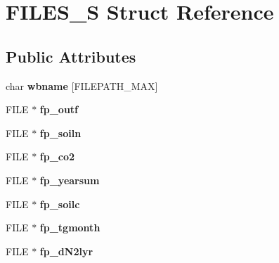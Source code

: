 \hypertarget{struct_f_i_l_e_s___s}{\section{F\-I\-L\-E\-S\-\_\-\-S Struct Reference}
\label{struct_f_i_l_e_s___s}
}
\subsection*{Public Attributes}
\begin{DoxyCompactItemize}
\item 
\hypertarget{struct_f_i_l_e_s___s_aa123f0bcb36488da38da31243d1b79e4}{char {\bfseries wbname} \mbox{[}F\-I\-L\-E\-P\-A\-T\-H\-\_\-\-M\-A\-X\mbox{]}}\label{struct_f_i_l_e_s___s_aa123f0bcb36488da38da31243d1b79e4}

\item 
\hypertarget{struct_f_i_l_e_s___s_a4e9539e24a0e99a259fd93043b599303}{F\-I\-L\-E $\ast$ {\bfseries fp\-\_\-outf}}\label{struct_f_i_l_e_s___s_a4e9539e24a0e99a259fd93043b599303}

\item 
\hypertarget{struct_f_i_l_e_s___s_ac4a1b6a8147b772fd68c34aceb000c5a}{F\-I\-L\-E $\ast$ {\bfseries fp\-\_\-soiln}}\label{struct_f_i_l_e_s___s_ac4a1b6a8147b772fd68c34aceb000c5a}

\item 
\hypertarget{struct_f_i_l_e_s___s_a7cd56ea3cb3dcca5d0ab457c17daec39}{F\-I\-L\-E $\ast$ {\bfseries fp\-\_\-co2}}\label{struct_f_i_l_e_s___s_a7cd56ea3cb3dcca5d0ab457c17daec39}

\item 
\hypertarget{struct_f_i_l_e_s___s_a924cdcbcdf4dddfbb8f1004fdb346495}{F\-I\-L\-E $\ast$ {\bfseries fp\-\_\-yearsum}}\label{struct_f_i_l_e_s___s_a924cdcbcdf4dddfbb8f1004fdb346495}

\item 
\hypertarget{struct_f_i_l_e_s___s_a8bf5ec4de49b696f4433686c825613f6}{F\-I\-L\-E $\ast$ {\bfseries fp\-\_\-soilc}}\label{struct_f_i_l_e_s___s_a8bf5ec4de49b696f4433686c825613f6}

\item 
\hypertarget{struct_f_i_l_e_s___s_a5b1c489608bb087f41b7a56ebe5e1936}{F\-I\-L\-E $\ast$ {\bfseries fp\-\_\-tgmonth}}\label{struct_f_i_l_e_s___s_a5b1c489608bb087f41b7a56ebe5e1936}

\item 
\hypertarget{struct_f_i_l_e_s___s_ad9117f3ea28e65655ed35094b15a426d}{F\-I\-L\-E $\ast$ {\bfseries fp\-\_\-d\-N2lyr}}\label{struct_f_i_l_e_s___s_ad9117f3ea28e65655ed35094b15a426d}


\end{DoxyCompactItemize}
